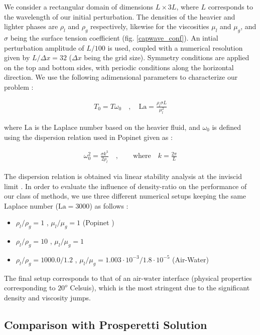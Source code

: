 We consider a rectangular domain of dimensions $L \times 3L$, where $L$ corresponds to the wavelength of our initial perturbation. The densities of the heavier and lighter phases are $\rho_l$ and $\rho_g$ respectively, likewise for the viscosities $\mu_l$ and $\mu_g$, and $\sigma$ being the surface tension coefficient (fig. \ref{capwave_conf}). An intial perturbation amplitude of $L/100$ is used, coupled with a numerical resolution given by $L/\Delta x= 32$ ($\Delta x$ being the grid size). Symmetry conditions are applied on the top and bottom sides, with periodic conditions along the horizontal direction. We use the following adimensional parameters to characterize our problem : 

\begin{align}
	T_0 = T \omega_0 \quad , \quad \textrm{La} = \frac{\rho_l \sigma L}{\mu_l^2}  
\end{align}

where $\textrm{La}$ is the Laplace number based on the heavier fluid, and $\omega_0$ is defined using the dispersion relation used in Popinet \cite{popinet2009accurate} given as : 

\begin{align}
	\omega_0^2 =  \frac{\sigma k^3}{2 \rho_l} \quad, \qquad \text{where} \quad k = \frac{2\pi}{L}   
\end{align}

The dispersion relation is obtained via linear stability analysis at the inviscid limit . In order to evaluate the influence of density-ratio on the performance of our class of methods, we use three different numerical setups keeping the same Laplace number ($\textrm{La} = 3000$) as follows : 

\begin{itemize}
	\item $\rho_l/\rho_g = 1$ , $\mu_l/\mu_g = 1$  (Popinet \cite{popinet2009accurate}) 
	\item $\rho_l/\rho_g = 10$ , $\mu_l/\mu_g = 1$   
	\item $\rho_l/\rho_g = 1000.0/1.2$ , $\mu_l/\mu_g = 1.003\cdot 10^{-3}/1.8\cdot 10^{-5}$ (Air-Water) 
\end{itemize}

The final setup corresponds to that of an air-water interface (physical properties corresponding to $20^o$ Celsuis), which is the most stringent due to the significant density and viscosity jumps. 

\subsection*{Comparison with Prosperetti Solution}

